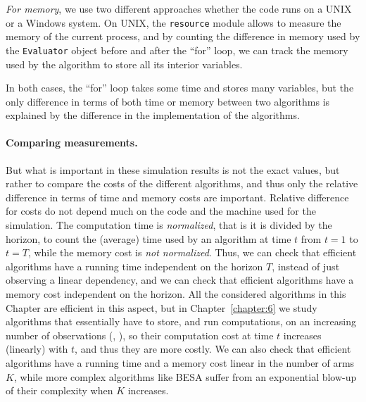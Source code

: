     \emph{For memory}, we use two different approaches whether the code runs on a UNIX or a Windows system.
    On UNIX, the \texttt{resource} module allows to measure the memory of the current process, and by counting the difference in memory used by the \texttt{Evaluator} object before and after the ``for'' loop, we can track the memory used by the algorithm to store all its interior variables.

In both cases, the ``for'' loop takes some time and stores many variables, but the only difference in terms of both time or memory between two algorithms is explained by the difference in the implementation of the algorithms.



\paragraph{Comparing measurements.}
But what is important in these simulation results is not the exact values, but rather to compare the costs of the different algorithms, and thus only the relative difference in terms of time and memory costs are important.
Relative difference for costs do not depend much on the code and the machine used for the simulation.
%
The computation time is \emph{normalized}, that is it is divided by the horizon, to count the (average) time used by an algorithm at time $t$ from $t=1$ to $t=T$, while the memory cost is \emph{not normalized}.
%
Thus, we can check that efficient algorithms have a running time independent on the horizon $T$, instead of just observing a linear dependency, and we can check that efficient algorithms have a memory cost independent on the horizon.
All the considered algorithms in this Chapter are efficient in this aspect, but in Chapter~\ref{chapter:6} we study algorithms that essentially have to store, and run computations, on an increasing number of observations (\eg, \CUSUMUCB), so their computation cost at time $t$ increases (linearly) with $t$, and thus they are more costly.
%
We can also check that efficient algorithms have a running time and a memory cost linear in the number of arms $K$, while more complex algorithms like BESA suffer from an exponential blow-up of their complexity when $K$ increases.


